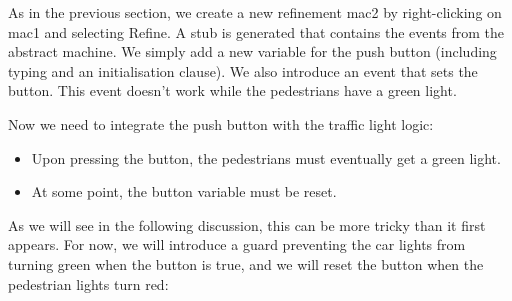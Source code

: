 As in the previous section, we create a new refinement \textsf{mac2} by right-clicking on \textsf{mac1} and selecting \textsf{Refine}.  A stub is generated that contains the events from the abstract machine.  We simply add a new variable for the push button (including typing and an initialisation clause).  We also introduce an event that sets the button.  This event doesn't work while the pedestrians have a green light.


Now we need to integrate the push button with the traffic light logic:
\begin{itemize}
	\item Upon pressing the button, the pedestrians must eventually get a green light.
	\item At some point, the button variable must be reset.
\end{itemize}

As we will see in the following discussion, this can be more tricky than it first appears.  For now, we will introduce a guard preventing the car lights from turning green when the button is true, and we will reset the button when the pedestrian lights turn red:

